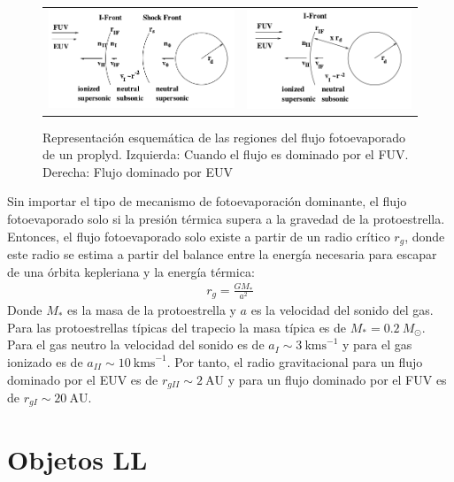   \begin{figure}
    \begin{tabular}{cc}
      \includegraphics[width=0.5\linewidth]{./Figures/Johnstone-2} &
      \includegraphics[width=0.5\linewidth]{./Figures/Johnstone-3}
    \end{tabular}
    \label{fig:EUV-FUV-IF}
    \caption{Representación esquemática de las regiones del flujo
      fotoevaporado de un proplyd. Izquierda: Cuando el flujo es dominado
    por el FUV. Derecha: Flujo dominado por EUV \citep{Johnstone:1998}}
  \end{figure}
  

Sin importar el tipo de mecanismo de fotoevaporación dominante, el flujo fotoevaporado solo si la presión térmica supera a la gravedad de la protoestrella. Entonces, el flujo fotoevaporado solo existe a partir de un radio crítico $r_g$, donde este radio se estima a partir del balance entre la energía necesaria para escapar de una órbita kepleriana y la energía térmica:
\begin{align}
  r_g = \frac{GM_*}{a^2}
\end{align}
Donde $M_*$ es la masa de la protoestrella y $a$ es la velocidad del sonido
del gas. Para las protoestrellas típicas del trapecio la masa típica es de
$M_* = 0.2~M_\odot$. Para el gas neutro la velocidad del sonido es de
$a_I \sim 3~\mathrm{kms}^{-1}$ y para el gas ionizado es de $a_{II} \sim 10~\mathrm{kms}^{-1}$.
Por tanto, el radio gravitacional para un flujo dominado por el EUV es de
$r_{gII} \sim 2~\mathrm{AU}$ y para un flujo dominado por el FUV es de
$r_{gI} \sim 20~\mathrm{AU}$.
\section{Objetos LL}
